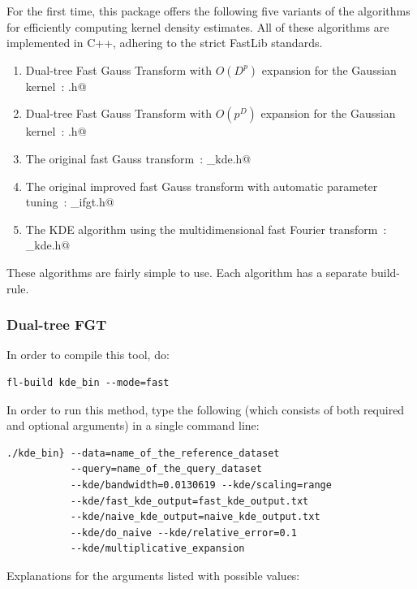 \documentclass[letter]{report}
\begin{document}
For the first time, this package offers the following five variants of
the algorithms for efficiently computing kernel density estimates. All
of these algorithms are implemented in C++, adhering to the strict
FastLib standards.

\begin{enumerate}
\item{Dual-tree Fast Gauss Transform with $O(D^p)$ expansion for the
Gaussian kernel~\cite{LEE06}: \verb@kde.h@}
\item{Dual-tree Fast Gauss Transform with $O(p^D)$ expansion for the
Gaussian kernel~\cite{LEE05}: \verb@kde.h@}
\item{The original fast Gauss transform~\cite{ggstrain}: \verb@fgt_kde.h@}
\item{The original improved fast Gauss transform with automatic
parameter tuning~\cite{YANG03}: \verb@original_ifgt.h@}
\item{The KDE algorithm using the multidimensional fast Fourier
transform~\cite{wand94}: \verb@fft_kde.h@}
\end{enumerate}

These algorithms are fairly simple to use. Each algorithm has a
separate build-rule.
\subsubsection{Dual-tree FGT}
In order to compile this tool, do: 
\begin{verbatim}
fl-build kde_bin --mode=fast
\end{verbatim}

In order to run this method, type the following (which consists of
both required and optional arguments) in a single command line:
\begin{verbatim}
./kde_bin} --data=name_of_the_reference_dataset
           --query=name_of_the_query_dataset
           --kde/bandwidth=0.0130619 --kde/scaling=range
           --kde/fast_kde_output=fast_kde_output.txt
           --kde/naive_kde_output=naive_kde_output.txt
           --kde/do_naive --kde/relative_error=0.1
           --kde/multiplicative_expansion
\end{verbatim}

Explanations for the arguments listed with possible values:
\end{document}

